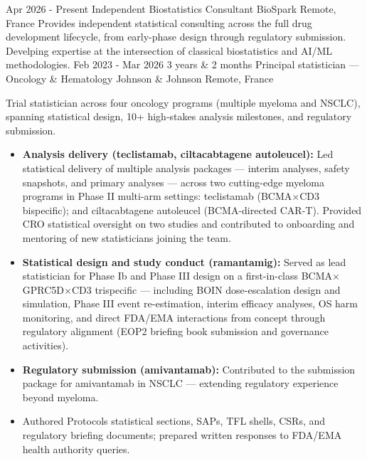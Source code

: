 \vspace*{.2em}
\begin{experiences}
\imageexperience
{Apr 2026 - Present}
{}
{Independent Biostatistics Consultant}
{BioSpark}
{Remote, France}
{}
{\vspace*{-2em}
Provides independent statistical consulting across the full drug development
 lifecycle, from early-phase design through regulatory submission. Develping
 expertise at the intersection of classical biostatistics and AI/ML methodologies.
}
{}
\emptySeparator
\imageexperience
{Feb 2023 - Mar 2026}
{3 years \& 2 months}
{Principal statistician --- Oncology \& Hematology}
{Johnson \& Johnson}
{Remote, France}
{}
{\vspace*{-2em}
Trial statistician across four oncology programs (multiple myeloma and NSCLC),
 spanning statistical design, 10+ high-stakes analysis milestones, and regulatory
  submission.
\begin{itemize}
\item \textbf{Analysis delivery (teclistamab, ciltacabtagene autoleucel):} 
Led statistical delivery of multiple analysis packages --- interim analyses,
 safety snapshots, and primary analyses --- across two cutting-edge myeloma
  programs in Phase II multi-arm settings: teclistamab
   (BCMA$\times$CD3 bispecific); and ciltacabtagene autoleucel
     (BCMA-directed CAR-T). Provided CRO statistical oversight on two studies and contributed to onboarding and mentoring of new statisticians joining the team.
\item \textbf{Statistical design and study conduct (ramantamig):} Served as lead
 statistician for Phase Ib and Phase III design on a first-in-class 
 BCMA$\times$GPRC5D$\times$CD3 trispecific --- including BOIN dose-escalation 
 design and simulation, Phase III event re-estimation, interim efficacy analyses,
  OS harm monitoring, and direct FDA/EMA interactions from concept through
   regulatory alignment (EOP2 briefing book submission and governance activities).
\item \textbf{Regulatory submission (amivantamab):} Contributed to the submission
 package for amivantamab in NSCLC --- extending regulatory experience beyond
  myeloma.
\item Authored Protocols statistical sections, SAPs, TFL shells, CSRs, and regulatory briefing documents; prepared written responses to FDA/EMA health authority queries.

\end{itemize}}
\end{experiences}
